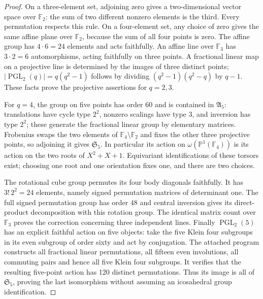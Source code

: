 \begin{proof}
On a three-element set, adjoining zero gives a two-dimensional vector space
over $\mathbb F_2$: the sum of two different nonzero elements is the third.
Every permutation respects this rule. On a four-element set, any choice
of zero gives the same affine plane over $\mathbb F_2$, because the sum of
all four points is zero. The affine group has $4\cdot6=24$ elements and
acts faithfully. An affine line over $\mathbb F_3$ has $3\cdot2=6$
automorphisms, acting faithfully on three points. A fractional linear map
on a projective line is determined by the images of three distinct points;
$|\operatorname{PGL}_2(q)|=q(q^2-1)$ follows by dividing
$(q^2-1)(q^2-q)$ by $q-1$. These facts prove the projective assertions for
$q=2,3$.

For $q=4$, the group on five points has order $60$ and is contained in
$\mathfrak A_5$: translations have cycle type $2^2$, nonzero scalings
have type $3$, and inversion has type $2^2$; these generate the fractional
linear group by elementary matrices. Frobenius swaps the two elements
of $\mathbb F_4\setminus\mathbb F_2$ and fixes the other three projective
points, so adjoining it gives $\mathfrak S_5$. In particular its action on
$\omega(\mathbb P^1(\mathbb F_4))$ is its action on the two roots of
$X^2+X+1$. Equivariant identifications of these torsors exist; choosing one
root and one orientation fixes one, and there are two choices.

The rotational cube group permutes its four body diagonals faithfully.
It has $3!\,2^2=24$ elements, namely signed permutation matrices of
determinant one. The full signed permutation group has order $48$ and
central inversion gives its direct-product decomposition with this
rotation group. The identical matrix count over $\mathbb F_3$ proves the
correction concerning three independent lines. Finally $\operatorname{PGL}_2(5)$ has an explicit faithful action on five
objects: take the five Klein four subgroups in its even subgroup of order
sixty and act by conjugation. The attached program constructs all fractional
linear permutations, all fifteen even involutions, all commuting pairs
and hence all five Klein four subgroups. It verifies that the resulting
five-point action has 120 distinct permutations. Thus its image is all
of $\mathfrak S_5$, proving the last isomorphism without assuming an
icosahedral group identification.
\end{proof}

